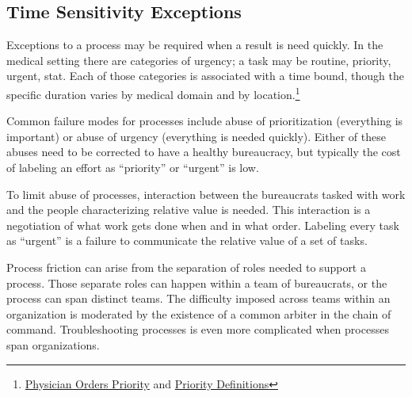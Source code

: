 \subsection*{Time Sensitivity Exceptions}
Exceptions to a process may be required when a result is need quickly. In the medical setting there are categories of urgency; a task may be routine, priority, urgent, stat. 
Each of those categories is associated with a time bound, though the specific duration varies by medical domain and by location.\footnote{\href{http://docport.columbia-stmarys.org/EHR/PhysicianOrdersPriorityandDeptServiceHours.aspx}{Physician Orders Priority} and \href{https://www.unitypoint.org/peoria/services-priority-definitions-and-critical-values.aspx}{Priority Definitions}}

Common failure modes for processes include abuse of prioritization (everything is important) or abuse of urgency (everything is needed quickly). Either of these abuses need to be corrected to have a healthy bureaucracy, but typically the cost of labeling an effort as ``priority'' or ``urgent'' is low. 

To limit abuse of processes, interaction between the bureaucrats tasked with work and the people characterizing relative value is needed. This interaction is a negotiation of what work gets done when and in what order. Labeling every task as ``urgent'' is a failure to communicate the relative value of a set of tasks.


Process friction can arise from the separation of roles needed to support a process. Those separate roles can happen within a team of bureaucrats, or the process can span distinct teams. The difficulty imposed across teams within an organization is moderated by the existence of a common arbiter in the chain of command.  
Troubleshooting processes is even more complicated when processes span organizations.  